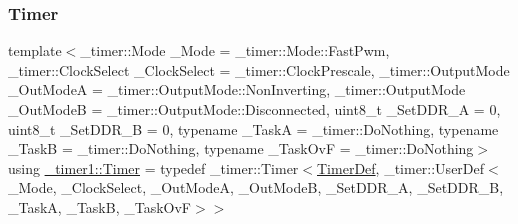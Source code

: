 \subsubsection{\texorpdfstring{Timer}{Timer}}
{\footnotesize\ttfamily template$<$\+\_\+timer\+::\+Mode \+\_\+\+Mode = \+\_\+timer\+::\+Mode\+::\+Fast\+Pwm, \+\_\+timer\+::\+Clock\+Select \+\_\+\+Clock\+Select = \+\_\+timer\+::\+Clock\+Prescale, \+\_\+timer\+::\+Output\+Mode \+\_\+\+Out\+ModeA = \+\_\+timer\+::\+Output\+Mode\+::\+Non\+Inverting, \+\_\+timer\+::\+Output\+Mode \+\_\+\+Out\+ModeB = \+\_\+timer\+::\+Output\+Mode\+::\+Disconnected, uint8\+\_\+t \+\_\+\+Set\+D\+D\+R\+\_\+A = 0, uint8\+\_\+t \+\_\+\+Set\+D\+D\+R\+\_\+B = 0, typename \+\_\+\+TaskA  = \+\_\+timer\+::\+Do\+Nothing, typename \+\_\+\+TaskB  = \+\_\+timer\+::\+Do\+Nothing, typename \+\_\+\+Task\+OvF  = \+\_\+timer\+::\+Do\+Nothing$>$ \\
using \hyperlink{namespace__timer1_a1a78c65942e5f6055e59b01b70692486}{\+\_\+timer1\+::\+Timer} = typedef \+\_\+timer\+::\+Timer$<$\hyperlink{struct__timer1_1_1TimerDef}{Timer\+Def}, \+\_\+timer\+::\+User\+Def$<$\+\_\+\+Mode, \+\_\+\+Clock\+Select, \+\_\+\+Out\+ModeA, \+\_\+\+Out\+ModeB, \+\_\+\+Set\+D\+D\+R\+\_\+A, \+\_\+\+Set\+D\+D\+R\+\_\+B, \+\_\+\+TaskA, \+\_\+\+TaskB, \+\_\+\+Task\+OvF$>$$>$}

